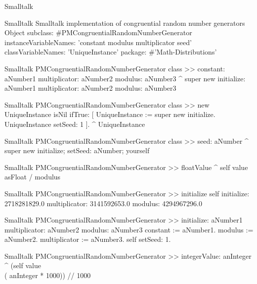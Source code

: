 \begin{displaycode}{Smalltalk}
\begin{listing}[label=ls:randomcong]{Smalltalk}
  {Smalltalk implementation of congruential random number generators}
Object subclass: #PMCongruentialRandomNumberGenerator
    instanceVariableNames: 'constant modulus multiplicator seed'
    classVariableNames: 'UniqueInstance'
    package: #'Math-Distributions'
\end{listing}

\begin{displaycode}{Smalltalk}
PMCongruentialRandomNumberGenerator class >> constant: aNumber1 multiplicator: aNumber2 modulus: aNumber3
    ^ super new 
        initialize: aNumber1
        multiplicator: aNumber2
        modulus: aNumber3

\end{displaycode}

\begin{displaycode}{Smalltalk}
PMCongruentialRandomNumberGenerator class >> new
    UniqueInstance isNil
        ifTrue: [ UniqueInstance := super new initialize.
                     UniqueInstance setSeed: 1 ].
    ^ UniqueInstance
\end{displaycode}

\begin{displaycode}{Smalltalk}
PMCongruentialRandomNumberGenerator class >> seed: aNumber
    ^ super new initialize; setSeed: aNumber; yourself
\end{displaycode}

\begin{displaycode}{Smalltalk}
PMCongruentialRandomNumberGenerator >> floatValue
    ^ self value asFloat / modulus
\end{displaycode}

\begin{displaycode}{Smalltalk}
PMCongruentialRandomNumberGenerator >> initialize
    self initialize: 2718281829.0 multiplicator: 3141592653.0 
                                                modulus: 4294967296.0
\end{displaycode}

\begin{displaycode}{Smalltalk}
PMCongruentialRandomNumberGenerator >> initialize: aNumber1 multiplicator: aNumber2 modulus: aNumber3
    constant := aNumber1.
    modulus := aNumber2.
    multiplicator := aNumber3.
    self setSeed: 1.
\end{displaycode}

\begin{displaycode}{Smalltalk}
PMCongruentialRandomNumberGenerator >> integerValue: anInteger
    ^ (self value \\ ( anInteger * 1000)) // 1000
\end{displaycode}


\end{displaycode}
